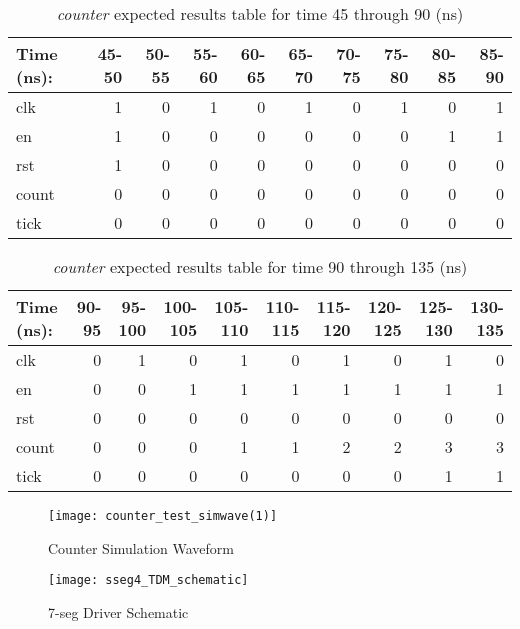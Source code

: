 \documentclass[11pt]{article}
\begin{document}
\begin{table*}[ht]\centering
	\caption{\textit{counter} expected results table for time 45 through 90 (ns)}
	\label{ALU:tbl:counter_ERT_2}\medskip
	\begin{tabular}{l|rrrrrrrrr}
		Time (ns): & 45-50 & 50-55 & 55-60 & 60-65 & 65-70 & 70-75 & 75-80 & 80-85 & 85-90 \\
		\midrule
		clk & 1 & 0 & 1 & 0 & 1 & 0 & 1 & 0 & 1 \\
		en  & 1 & 0 & 0 & 0 & 0 & 0 & 0 & 1 & 1 \\
		rst & 1 & 0 & 0 & 0 & 0 & 0 & 0 & 0 & 0 \\
		count & 0 & 0 & 0 & 0 & 0 & 0 & 0 & 0 & 0 \\
		tick & 0 & 0 & 0 & 0 & 0 & 0 & 0 & 0 & 0 \\
		\bottomrule
	\end{tabular}
\end{table*}

\begin{table*}[ht]\centering
	\caption{\textit{counter} expected results table for time 90 through 135 (ns)}
	\label{ALU:tbl:counter_ERT_3}\medskip
	\begin{tabular}{l|rrrrrrrrr}
		Time (ns): & 90-95 & 95-100 & 100-105 & 105-110 & 110-115 & 115-120 & 120-125 & 125-130 & 130-135 \\
		\midrule
		clk & 0 & 1 & 0 & 1 & 0 & 1 & 0 & 1 & 0 \\
		en  & 0 & 0 & 1 & 1 & 1 & 1 & 1 & 1 & 1 \\
		rst & 0 & 0 & 0 & 0 & 0 & 0 & 0 & 0 & 0 \\
		count & 0 & 0 & 0 & 1 & 1 & 2 & 2 & 3 & 3 \\
		tick & 0 & 0 & 0 & 0 & 0 & 0 & 0 & 1 & 1 \\
		\bottomrule
	\end{tabular}
\end{table*}

\begin{figure}[ht]\centering
	\texttt{[image: counter\_test\_simwave(1)]}
	\caption{Counter Simulation Waveform}
	\label{fig:counter_simwave}			
\end{figure}
\clearpage

\begin{figure}[ht]\centering
	\texttt{[image: sseg4\_TDM\_schematic]}
	\caption{7-seg Driver Schematic}
	\label{fig:sseg4_TDM_schematic}			
\end{figure}
\clearpage
\end{document}
